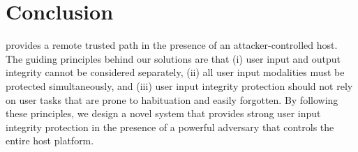\section{Conclusion}
\label{sec:conclusionProtection}

\name provides a remote trusted path in the presence of an attacker-controlled host. The guiding principles behind our solutions are that (i) user input and output integrity cannot be considered separately, (ii) all user input modalities must be protected simultaneously, and (iii) user input integrity protection should not rely on user tasks that are prone to habituation and easily forgotten. By following these principles, we design a novel system that provides strong user input integrity protection in the presence of a powerful adversary that controls the entire host platform.